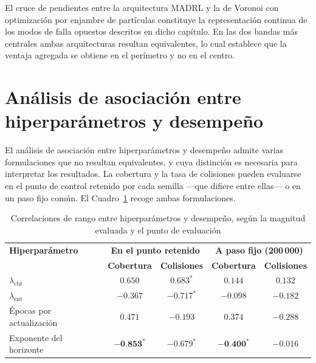 El cruce de pendientes entre la arquitectura MADRL y la de Voronoi con
optimización por enjambre de partículas constituye la representación continua
de los modos de falla opuestos descritos en dicho capítulo. En las dos bandas
más centrales ambas arquitecturas resultan equivalentes, lo cual establece que
la ventaja agregada se obtiene en el perímetro y no en el centro.

\section{Análisis de asociación entre hiperparámetros y desempeño}

El análisis de asociación entre hiperparámetros y desempeño admite varias
formulaciones que no resultan equivalentes, y cuya distinción es necesaria para
interpretar los resultados. La cobertura y la tasa de colisiones pueden
evaluarse en el punto de control retenido por cada semilla —que difiere entre
ellas— o en un paso fijo común. El Cuadro~\ref{tab:correlaciones_J} recoge
ambas formulaciones.

\begin{table}[h]
    \centering\captionsetup{width=0.95\linewidth}
    \caption{Correlaciones de rango entre hiperparámetros y desempeño, según
             la magnitud evaluada y el punto de evaluación}
    \begin{tabular}{lcccc}
        \textbf{Hiperparámetro} & \multicolumn{2}{c}{\textbf{En el punto
        retenido}} & \multicolumn{2}{c}{\textbf{A paso fijo (200\,000)}} \\
        & \textbf{Cobertura} & \textbf{Colisiones} & \textbf{Cobertura} &
        \textbf{Colisiones} \\
        \hline
        $\lambda_{\text{cbf}}$ & $0{.}650$ & $0{.}683^{*}$ & $0{.}144$
            & $0{.}132$ \\
        $\lambda_{\text{ent}}$ & $-0{.}367$ & $-0{.}717^{*}$ & $-0{.}098$
            & $-0{.}182$ \\
        Épocas por actualización & $0{.}471$ & $-0{.}193$ & $0{.}374$
            & $-0{.}288$ \\
        Exponente del horizonte & $\mathbf{-0{.}853^{*}}$ & $-0{.}679^{*}$
            & $\mathbf{-0{.}400^{*}}$ & $-0{.}016$ \\
    \end{tabular}
    \label{tab:correlaciones_J}
\end{table}

